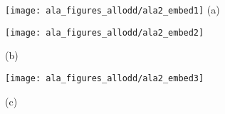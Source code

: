 \documentclass[]{article}
\begin{document}
\centering
\begin{minipage}{0.3\textwidth}
\centering
    \texttt{[image: ala\_figures\_allodd/ala2\_embed1]}
    (a)
\end{minipage}
\begin{minipage}{0.3\textwidth}
\centering
    \texttt{[image: ala\_figures\_allodd/ala2\_embed2]}

(b)
\end{minipage}
\begin{minipage}{0.3\textwidth}
\centering
    \texttt{[image: ala\_figures\_allodd/ala2\_embed3]}

(c)
\end{minipage}
\end{document}
